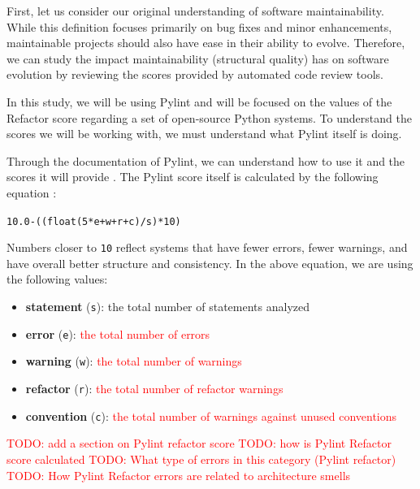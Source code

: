 \documentclass[12pt,conference]{IEEEtran}
\newcommand\todo[1]{\textcolor{red}{#1}}
\newcommand{\code}[1]{\texttt{#1}}
\begin{document}

First, let us consider our original understanding of software maintainability. While this definition focuses primarily on bug fixes and minor enhancements, maintainable projects should also have ease in their ability to evolve. Therefore, we can study the impact maintainability (structural quality) has on software evolution by reviewing the scores provided by automated code review tools.

In this study, we will be using Pylint and will be focused on the values of the Refactor score regarding a set of open-source Python systems. To understand the scores we will be working with, we must understand what Pylint itself is doing. 

Through the documentation of Pylint, we can understand how to use it and the scores it will provide \cite{pylint:main}. The Pylint score itself is calculated by the following equation \cite{pylint:score}:

\vspace{0.25cm}

\code{10.0-((float(5*e+w+r+c)/s)*10)}

\vspace{0.25cm}

Numbers closer to \code{10} reflect systems that have fewer errors, fewer warnings, and have overall better structure and consistency. In the above equation, we are using the following values:

\vspace{0.25cm}

\begin{itemize}
    \item \textbf{statement} (\code{s}): the total number of statements analyzed
    \item \textbf{error} (\code{e}): \todo{the total number of errors}
    \item \textbf{warning} (\code{w}): \todo{the total number of warnings}
    \item \textbf{refactor} (\code{r}): \todo{the total number of refactor warnings}
    \item \textbf{convention} (\code{c}): \todo{the total number of warnings against unused conventions}
\end{itemize}

\vspace{0.25cm}

\todo{TODO: add a section on Pylint refactor score}
\todo{TODO: how is Pylint Refactor score calculated}
\todo{TODO: What type of errors in this category (Pylint refactor)}
\todo{TODO: How Pylint Refactor errors are related to architecture smells}
\end{document}
